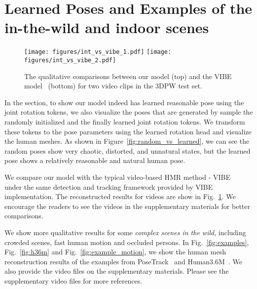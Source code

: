 	




\section{Learned Poses and Examples of the in-the-wild and indoor scenes}
\label{appendix:examples}

\begin{figure}
	\centering
	\texttt{[image: figures/int\_vs\_vibe\_1.pdf]}
	\texttt{[image: figures/int\_vs\_vibe\_2.pdf]}
	\caption{The qualitative comparisons between our model (top) and the VIBE model~\citep{vibe:kocabas2020vibe} (bottom) for two video clips in the 3DPW test set.  
	}
	\label{appendix:int_vs_vibe}
\end{figure}

In the section, to show our model indeed has learned reasonable pose using the joint rotation tokens, we also visualize the poses that are generated by sample the randomly initialized and the finally learned joint rotation tokens. We transform these tokens to the pose parameters using the learned rotation head and visualize the human meshes. As shown in Figure~\ref{fig:random_vs_learned}, we can see the random poses show very chaotic, distorted, and unnatural states, but the learned pose shows a relatively reasonable and natural human pose. 


We compare our model with the typical video-based HMR method - VIBE~\citep{vibe:kocabas2020vibe} under the same detection and tracking framework provided by VIBE implementation. The reconstructed results for videos are show in Fig.~\ref{appendix:int_vs_vibe}. We encourage the readers to see the videos in the supplementary materials for better comparisons.

We show more qualitative results for some \textit{complex scenes in the wild}, including crowded scenes, fast human motion and occluded persons. In Fig.~\ref{fig:examples}, Fig.~\ref{fig:h36m} and Fig.~\ref{fig:example_motion}, we show the human mesh reconstruction results of the examples from PoseTrack~\citep{posetrack:andriluka2018posetrack} and Human3.6M~\citep{h36m:ionescu2013human3}. We also provide the video files on the supplementary materials. Please see the supplementary video files for more references. %



